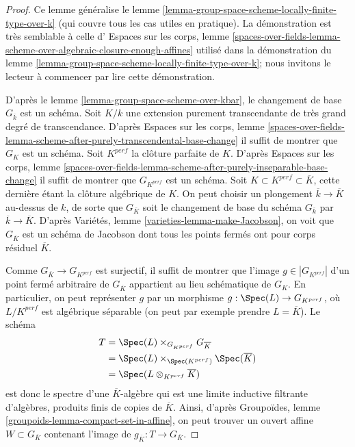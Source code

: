 \begin{proof}
Ce lemme généralise le
lemme \ref{lemma-group-space-scheme-locally-finite-type-over-k}
(qui couvre tous les cas utiles en pratique).
La démonstration est très semblable à celle d'
Espaces sur les corps, lemme
\ref{spaces-over-fields-lemma-scheme-over-algebraic-closure-enough-affines}
utilisé dans la démonstration du
lemme \ref{lemma-group-space-scheme-locally-finite-type-over-k};
nous invitons le lecteur à commencer par lire cette démonstration.

\medskip\noindent
D'après le lemme \ref{lemma-group-space-scheme-over-kbar}, le changement
de base $G_{\overline{k}}$ est un schéma.
Soit $K/k$ une extension purement transcendante de très grand
degré de transcendance. D'après Espaces sur les corps, lemme
\ref{spaces-over-fields-lemma-scheme-after-purely-transcendental-base-change}
il suffit de montrer que $G_K$ est un schéma.
Soit $K^{perf}$ la clôture parfaite de $K$. D'après
Espaces sur les corps, lemme
\ref{spaces-over-fields-lemma-scheme-after-purely-inseparable-base-change}
il suffit de montrer que $G_{K^{perf}}$ est un schéma.
Soit $K \subset K^{perf} \subset \overline{K}$, cette dernière étant la clôture algébrique
de $K$. On peut choisir un plongement
$\overline{k} \to \overline{K}$ au-dessus de $k$, de sorte que $G_{\overline{K}}$
soit le changement de base du schéma $G_{\overline{k}}$ par $\overline{k} \to \overline{K}$. D'après
Variétés, lemme \ref{varieties-lemma-make-Jacobson},
on voit que $G_{\overline{K}}$ est un schéma de Jacobson dont tous les
points fermés ont pour corps résiduel $\overline{K}$.

\medskip\noindent
Comme $G_{\overline{K}} \to G_{K^{perf}}$ est surjectif, il suffit de
montrer que l'image $g \in |G_{K^{perf}}|$ d'un point fermé arbitraire de
$G_{\overline{K}}$ appartient au lieu schématique de $G_K$.
En particulier, on peut représenter $g$ par un morphisme
$g : \Spec(L) \to G_{K^{perf}}$, où $L/K^{perf}$ est algébrique séparable
(on peut par exemple prendre $L = \overline{K}$). Le schéma
\begin{align*}
T & = \Spec(L) \times_{G_{K^{perf}}} G_{\overline{K}} \\
& =
\Spec(L) \times_{\Spec(K^{perf})} \Spec(\overline{K}) \\
& =
\Spec(L \otimes_{K^{perf}} \overline{K})
\end{align*}
est donc le spectre d'une $\overline{K}$-algèbre qui est une limite inductive
filtrante d'algèbres, produits finis de copies de $\overline{K}$.
Ainsi, d'après Groupoïdes, lemme \ref{groupoids-lemma-compact-set-in-affine},
on peut trouver un ouvert affine $W \subset G_{\overline{K}}$ contenant
l'image de $g_{\overline{K}} : T \to G_{\overline{K}}$.


\end{proof}
